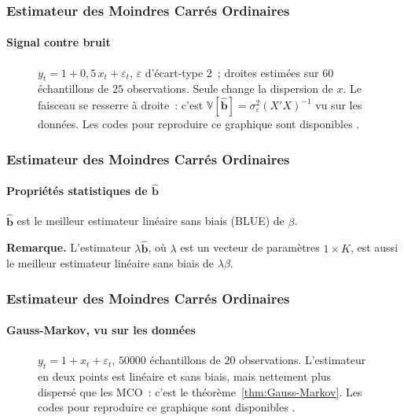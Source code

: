 \documentclass[10pt]{beamer}
\begin{document}
\begin{frame}[c]
  \frametitle{Estimateur des Moindres Carrés Ordinaires}
  \framesubtitle{Signal contre bruit}

  \begin{figure}
    \centering
    \scalebox{.46}{}
    \caption{$y_t = 1 + 0{,}5\,x_t + \varepsilon_t$, $\varepsilon$ d'écart-type $2$~; droites estimées sur $60$ échantillons de $25$ observations. Seule change la dispersion de $x$. Le faisceau se resserre à droite~: c'est $\mathbb V[\hat{\mathbf b}] = \sigma_{\varepsilon}^2 (X'X)^{-1}$ vu sur les données. Les codes pour reproduire ce graphique sont disponibles .}
  \end{figure}

\end{frame}


\begin{frame}
  \frametitle{Estimateur des Moindres Carrés Ordinaires}
  \framesubtitle {Propriétés statistiques de $\hat{\mathbf b}$}


  \begin{theorem}\label{thm:Gauss-Markov}
    $\hat{\mathbf b}$ est le meilleur estimateur linéaire sans biais (BLUE) de $\beta$.
  \end{theorem}

  \bigskip\bigskip

  \textbf{Remarque.} L'estimateur $\lambda \hat{\mathbf b}$, où $\lambda$ est un vecteur de paramètres $1\times K$, est aussi le meilleur estimateur linéaire sans biais de $\lambda \beta$.
\end{frame}


\begin{frame}[c]
  \frametitle{Estimateur des Moindres Carrés Ordinaires}
  \framesubtitle{Gauss-Markov, vu sur les données}

  \begin{figure}
    \centering
    \scalebox{.46}{}
    \caption{$y_t = 1 + x_t + \varepsilon_t$, $50000$ échantillons de $20$ observations. L'estimateur \guillemotleft en deux points \guillemotright{} est linéaire et sans biais, mais nettement plus dispersé que les MCO~: c'est le théorème~\ref{thm:Gauss-Markov}. Les codes pour reproduire ce graphique sont disponibles .}
  \end{figure}

\end{frame}
\end{document}

